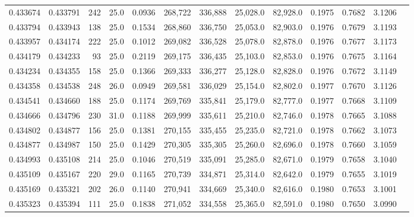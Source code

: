 \begin{tabular}{rrrrrrrrrrrrr}
0.433674 & 0.433791 &   242 & 25.0 &                                     0.0936 & 268,722 & 336,888 &  25,028.0 &  82,928.0 & 0.1975 & 0.7682 & 3.1206 \\
0.433794 & 0.433943 &   138 & 25.0 &                                     0.1534 & 268,860 & 336,750 &  25,053.0 &  82,903.0 & 0.1976 & 0.7679 & 3.1193 \\
0.433957 & 0.434174 &   222 & 25.0 &                                     0.1012 & 269,082 & 336,528 &  25,078.0 &  82,878.0 & 0.1976 & 0.7677 & 3.1173 \\
0.434179 & 0.434233 &    93 & 25.0 &                                     0.2119 & 269,175 & 336,435 &  25,103.0 &  82,853.0 & 0.1976 & 0.7675 & 3.1164 \\
0.434234 & 0.434355 &   158 & 25.0 &                                     0.1366 & 269,333 & 336,277 &  25,128.0 &  82,828.0 & 0.1976 & 0.7672 & 3.1149 \\
0.434358 & 0.434538 &   248 & 26.0 &                                     0.0949 & 269,581 & 336,029 &  25,154.0 &  82,802.0 & 0.1977 & 0.7670 & 3.1126 \\
0.434541 & 0.434660 &   188 & 25.0 &                                     0.1174 & 269,769 & 335,841 &  25,179.0 &  82,777.0 & 0.1977 & 0.7668 & 3.1109 \\
0.434666 & 0.434796 &   230 & 31.0 &                                     0.1188 & 269,999 & 335,611 &  25,210.0 &  82,746.0 & 0.1978 & 0.7665 & 3.1088 \\
0.434802 & 0.434877 &   156 & 25.0 &                                     0.1381 & 270,155 & 335,455 &  25,235.0 &  82,721.0 & 0.1978 & 0.7662 & 3.1073 \\
0.434877 & 0.434987 &   150 & 25.0 &                                     0.1429 & 270,305 & 335,305 &  25,260.0 &  82,696.0 & 0.1978 & 0.7660 & 3.1059 \\
0.434993 & 0.435108 &   214 & 25.0 &                                     0.1046 & 270,519 & 335,091 &  25,285.0 &  82,671.0 & 0.1979 & 0.7658 & 3.1040 \\
0.435109 & 0.435167 &   220 & 29.0 &                                     0.1165 & 270,739 & 334,871 &  25,314.0 &  82,642.0 & 0.1979 & 0.7655 & 3.1019 \\
0.435169 & 0.435321 &   202 & 26.0 &                                     0.1140 & 270,941 & 334,669 &  25,340.0 &  82,616.0 & 0.1980 & 0.7653 & 3.1001 \\
0.435323 & 0.435394 &   111 & 25.0 &                                     0.1838 & 271,052 & 334,558 &  25,365.0 &  82,591.0 & 0.1980 & 0.7650 & 3.0990 \\

\end{tabular}
